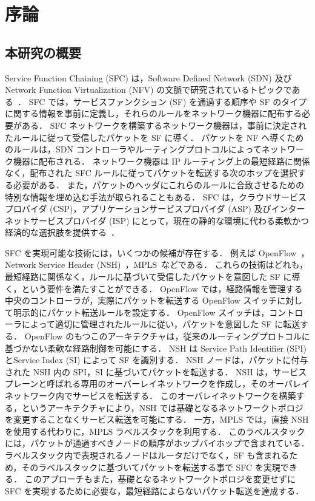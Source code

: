 \chapter{序論}
\label{chap:introduction}
\section{本研究の概要}
\label{section:background}
Service Function Chaining (SFC) は，Software Defined Network (SDN) 及び Network Function Virtualization (NFV) の文脈で研究されているトピックである~\cite{nfv,sfc-on-sdn-nfv-servey,sfc-on-sdn-scenario,imple-sfc-with-openflow}．
SFC では，サービスファンクション (SF) を通過する順序や SF のタイプに関する情報を事前に定義し，それらのルールをネットワーク機器に配布する必要がある．
SFC ネットワークを構築するネットワーク機器は，事前に決定されたルールに従って受信したパケットを SF に導く．
パケットを NF へ導くためのルールは，SDN コントローラやルーティングプロトコルによってネットワーク機器に配布される．
ネットワーク機器は IP ルーティング上の最短経路に関係なく，配布された SFC ルールに従ってパケットを転送する次のホップを選択する必要がある．
また，パケットのヘッダにこれらのルールに合致させるための特別な情報を埋め込む手法が取られることもある．
SFC は，クラウドサービスプロバイダ (CSP)，アプリケーションサービスプロバイダ (ASP) 及びインターネットサービスプロバイダ (ISP) にとって，現在の静的な環境に代わる柔軟かつ経済的な選択肢を提供する~\cite{survey-on-sfc}．

SFC を実現可能な技術には，いくつかの候補が存在する．
例えば OpenFlow~\cite{openflow}，Network Service Header (NSH)~\cite{rfc8300}，MPLS~\cite{rfc8595}などである．
これらの技術はどれも，最短経路に関係なく，ルールに基づいて受信したパケットを意図した SF に導く，という要件を満たすことができる．
OpenFlow では，経路情報を管理する中央のコントローラが，実際にパケットを転送する OpenFlow スイッチに対して明示的にパケット転送ルールを設定する．
OpenFlow スイッチは，コントローラによって適切に管理されたルールに従い，パケットを意図した SF に転送する．
OpenFlow のもつこのアーキテクチャは，従来のルーティングプロトコルに基づかない柔軟な経路制御を可能にする．
NSH は Service Path Identifier (SPI) とService Index (SI) によって SF を識別する．
NSH ノードは，パケットに付与された NSH 内の SPI，SI に基づいてパケットを転送する．
NSH は，サービスプレーンと呼ばれる専用のオーバーレイネットワークを作成し，そのオーバレイネットワーク内でサービスを転送する．
このオーバレイネットワークを構築する，というアーキテクチャにより，NSH では基礎となるネットワークトポロジを変更することなくサービス転送を可能にする．
一方，MPLS では，直接 NSH を使用する代わりに，MPLS ラベルスタックを利用する．
このラベルスタックには，パケットが通過すべきノードの順序がホップバイホップで含まれている．
ラベルスタック内で表現されるノードはルータだけでなく，SF も含まれるため，そのラベルスタックに基づいてパケットを転送する事で SFC を実現できる．
このアプローチもまた，基礎となるネットワークトポロジを変更せずに SFC を実現するために必要な，最短経路によらないパケット転送を達成する．

